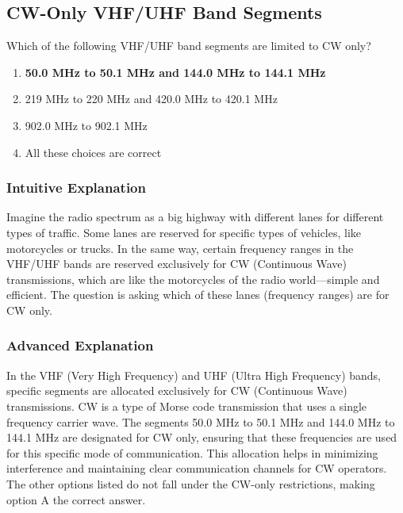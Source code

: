 \subsection{CW-Only VHF/UHF Band Segments}
\label{T1B07}

\begin{tcolorbox}[colback=gray!10!white,colframe=black!75!black,title=T1B07]
Which of the following VHF/UHF band segments are limited to CW only?
\begin{enumerate}[label=\Alph*,noitemsep]
    \item \textbf{50.0 MHz to 50.1 MHz and 144.0 MHz to 144.1 MHz}
    \item 219 MHz to 220 MHz and 420.0 MHz to 420.1 MHz
    \item 902.0 MHz to 902.1 MHz
    \item All these choices are correct
\end{enumerate}
\end{tcolorbox}

\subsubsection{Intuitive Explanation}
Imagine the radio spectrum as a big highway with different lanes for different types of traffic. Some lanes are reserved for specific types of vehicles, like motorcycles or trucks. In the same way, certain frequency ranges in the VHF/UHF bands are reserved exclusively for CW (Continuous Wave) transmissions, which are like the motorcycles of the radio world—simple and efficient. The question is asking which of these lanes (frequency ranges) are for CW only.

\subsubsection{Advanced Explanation}
In the VHF (Very High Frequency) and UHF (Ultra High Frequency) bands, specific segments are allocated exclusively for CW (Continuous Wave) transmissions. CW is a type of Morse code transmission that uses a single frequency carrier wave. The segments 50.0 MHz to 50.1 MHz and 144.0 MHz to 144.1 MHz are designated for CW only, ensuring that these frequencies are used for this specific mode of communication. This allocation helps in minimizing interference and maintaining clear communication channels for CW operators. The other options listed do not fall under the CW-only restrictions, making option A the correct answer.